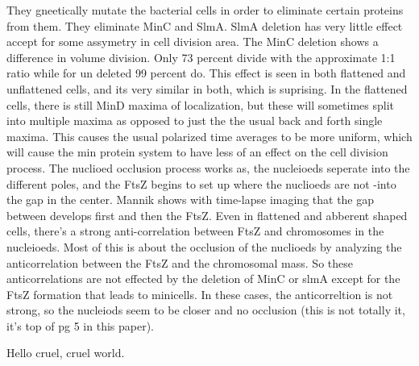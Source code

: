 \documentclass[pdftex,10pt,a4paper]{article}
\begin{document}
They gneetically mutate the bacterial cells in order to eliminate certain proteins from them.  They eliminate MinC and SlmA.  SlmA deletion has very little effect accept for some assymetry in cell division area.  The MinC deletion shows a difference in volume division.  Only 73 percent divide with the approximate 1:1 ratio while for un deleted 99 percent do.  This effect is seen in both flattened and unflattened cells, and its very similar in both, which is suprising.
In the flattened cells, there is still MinD maxima of localization, but these will sometimes split into multiple maxima as opposed to just the the usual back and forth single maxima.  This causes the usual polarized time averages to be more uniform, which will cause the min protein system to have less of an effect on the cell division process.  
The nuclioed occlusion process works as, the nucleioeds seperate into the different poles, and the FtsZ begins to set up where the nuclioeds are not -into the gap in the center.  Mannik shows with time-lapse imaging that the gap between develops first and then the FtsZ.  Even in flattened and abberent shaped cells, there's a strong anti-correlation between FtsZ and chromosomes in the nucleioeds.  Most of this is about the occlusion of the nuclioeds by analyzing the anticorrelation between the FtsZ and the chromosomal mass.  So these anticorrelations are not effected by the deletion of MinC or slmA except for the FtsZ formation that leads to minicells.  In these cases, the anticorreltion is not strong, so the nucleiods seem to be closer and no occlusion (this is not totally it, it's top of pg 5 in this paper).  

Hello cruel, cruel world. \cite{huang2003dynamic} \cite{mannik2012robustness}
\cite{huang2006curvature}

\end{document}
